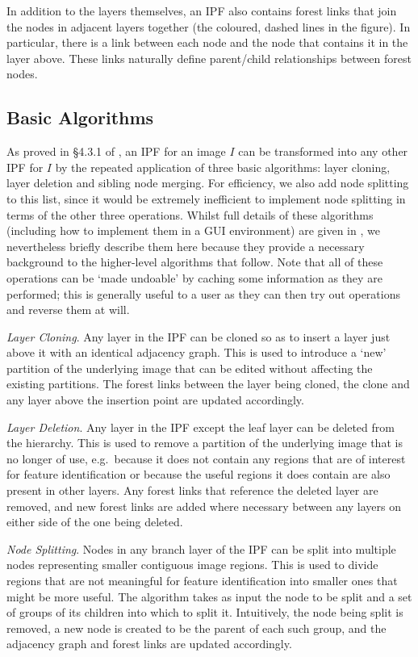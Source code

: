 \documentclass[10pt,twocolumn,twoside]{IEEEtran}
\begin{document}
In addition to the layers themselves, an IPF also contains forest links that join the nodes in adjacent layers together (the coloured, dashed lines in the figure). In particular, there is a link between each node and the node that contains it in the layer above. These links naturally define parent/child relationships between forest nodes.

\subsection{Basic Algorithms}

As proved in \S4.3.1 of \cite{golodetz11}, an IPF for an image $I$ can be transformed into any other IPF for $I$ by the repeated application of three basic algorithms: layer cloning, layer deletion and sibling node merging. For efficiency, we also add node splitting to this list, since it would be extremely inefficient to implement node splitting in terms of the other three operations. Whilst full details of these algorithms (including how to implement them in a GUI environment) are given in \cite{golodetz11}, we nevertheless briefly describe them here because they provide a necessary background to the higher-level algorithms that follow. Note that all of these operations can be `made undoable' by caching some information as they are performed; this is generally useful to a user as they can then try out operations and reverse them at will.

\emph{Layer Cloning}. Any layer in the IPF can be cloned so as to insert a layer just above it with an identical adjacency graph. This is used to introduce a `new' partition of the underlying image that can be edited without affecting the existing partitions. The forest links between the layer being cloned, the clone and any layer above the insertion point are updated accordingly.

\emph{Layer Deletion}. Any layer in the IPF except the leaf layer can be deleted from the hierarchy. This is used to remove a partition of the underlying image that is no longer of use, e.g.~because it does not contain any regions that are of interest for feature identification or because the useful regions it does contain are also present in other layers. Any forest links that reference the deleted layer are removed, and new forest links are added where necessary between any layers on either side of the one being deleted.

\emph{Node Splitting}. Nodes in any branch layer of the IPF can be split into multiple nodes representing smaller contiguous image regions. This is used to divide regions that are not meaningful for feature identification into smaller ones that might be more useful. The algorithm takes as input the node to be split and a set of groups of its children into which to split it. Intuitively, the node being split is removed, a new node is created to be the parent of each such group, and the adjacency graph and forest links are updated accordingly.
\end{document}
